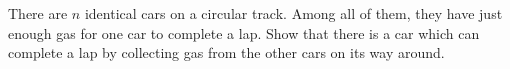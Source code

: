 There are $n$ identical cars on a circular track. Among all of them, they have just enough gas for one car to complete a lap. Show that there is a car which can complete a lap by collecting gas from the other cars on its way around.
